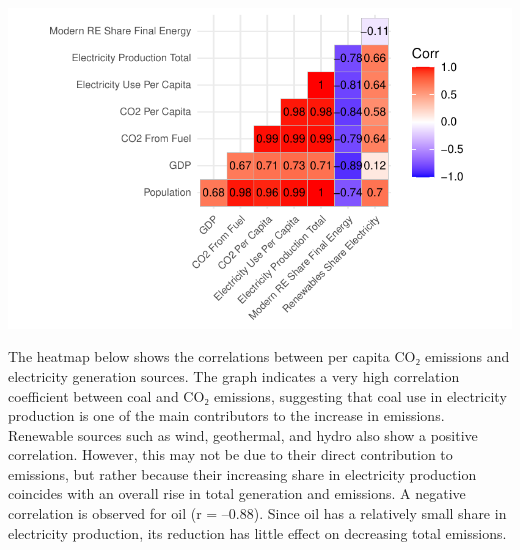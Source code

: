 \documentclass[
  letterpaper,
  DIV=11,
  numbers=noendperiod]{scrartcl}
\begin{document}
\includegraphics{project_files/figure-pdf/unnamed-chunk-22-1.pdf}

The heatmap below shows the correlations between per capita CO₂
emissions and electricity generation sources. The graph indicates a very
high correlation coefficient between coal and CO₂ emissions, suggesting
that coal use in electricity production is one of the main contributors
to the increase in emissions. Renewable sources such as wind,
geothermal, and hydro also show a positive correlation. However, this
may not be due to their direct contribution to emissions, but rather
because their increasing share in electricity production coincides with
an overall rise in total generation and emissions. A negative
correlation is observed for oil (r = --0.88). Since oil has a relatively
small share in electricity production, its reduction has little effect
on decreasing total emissions.
\end{document}

